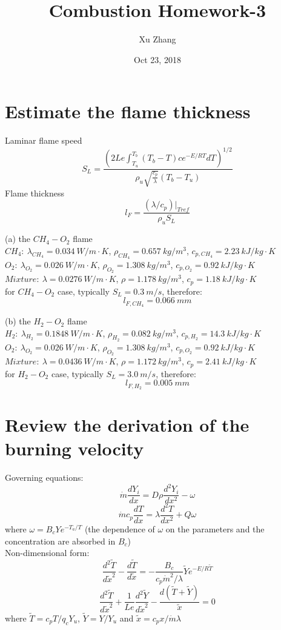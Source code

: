 \documentclass[a4paper, 11pt]{article}
\title{Combustion Homework-3}
\author{Xu Zhang}
\date{Oct 23, 2018}
\begin{document}
\maketitle

\section{Estimate the flame thickness}
Laminar flame speed 
$$
    S_L=\frac{(2Le\int_{T_u}^{T_b} (T_b-T)ce^{-E/RT}dT)^{1/2}}{{\rho}_u\sqrt{\frac{c_p}{\lambda}}(T_b-T_u)}
$$
Flame thickness
$$
    l_F=\frac{(\lambda/c_p)|_{Tref}}{\rho_uS_L}
$$

(a) the $CH_4-O_2$ flame\\
$CH_4:\ \lambda_{CH_4}=0.034\ W/m\cdot K$, $\rho_{CH_4}=0.657\ kg/m^3$, $c_{p,CH_4}=2.23\ kJ/kg\cdot K$\\
$O_2:\ \lambda_{O_2}=0.026\ W/m\cdot K$, $\rho_{O_2}=1.308\ kg/m^3$, $c_{p,O_2}=0.92\ kJ/kg\cdot K$\\
$Mixture:\ \lambda=0.0276\ W/m\cdot K$, $\rho=1.178\ kg/m^3$, $c_p=1.18\ kJ/kg\cdot K$\\
for $CH_4-O_2$ case, typically $S_L=0.3\ m/s$, therefore:
$$
    l_{F,CH_4}=0.066\ mm
$$

(b) the $H_2-O_2$ flame\\
$H_2:\ \lambda_{H_2}=0.1848\ W/m\cdot K$, $\rho_{H_2}=0.082\ kg/m^3$, $c_{p,H_2}=14.3\ kJ/kg\cdot K$\\
$O_2:\ \lambda_{O_2}=0.026\ W/m\cdot K$, $\rho_{O_2}=1.308\ kg/m^3$, $c_{p,O_2}=0.92\ kJ/kg\cdot K$\\
$Mixture:\ \lambda=0.0436\ W/m\cdot K$, $\rho=1.172\ kg/m^3$, $c_p=2.41\ kJ/kg\cdot K$\\
for $H_2-O_2$ case, typically $S_L=3.0\ m/s$, therefore:
$$
    l_{F,H_2}=0.005\ mm
$$


\section{Review the derivation of the burning velocity}
Governing equations:
$$
    \dot{m} \frac{dY_i}{dx}=D\rho \frac{d^2Y_i}{dx^2} - \omega
$$
$$
    \dot{m} c_p \frac{dT}{dx}=\lambda \frac{d^2T}{dx^2} + Q \omega
$$
where $\omega = B_cYe^{-T_a/T}$ (the dependence of $\omega$ on the  parameters and the concentration are absorbed in $B_c$)\\
Non-dimensional form:
$$
    \frac{d^2\tilde{T}}{d\tilde{x}^2} - \frac{d\tilde{T}}{d\tilde{x}} = -\frac{B_c}{c_p\dot{m}^2/\lambda}\tilde{Y}e^{-E/R\tilde{T}}
$$
$$
    \frac{d^2\tilde{T}}{d\tilde{x}^2}+\frac{1}{Le}\frac{d^2\tilde{Y}}{d\tilde{x}^2}-\frac{d(\tilde{T}+\tilde{Y})}{\tilde{x}}=0
$$
where $\tilde{T}=c_pT/q_cY_u$, $\tilde{Y}=Y/Y_u$ and $\tilde{x}=c_px/\dot{m}\lambda$
\end{document}
